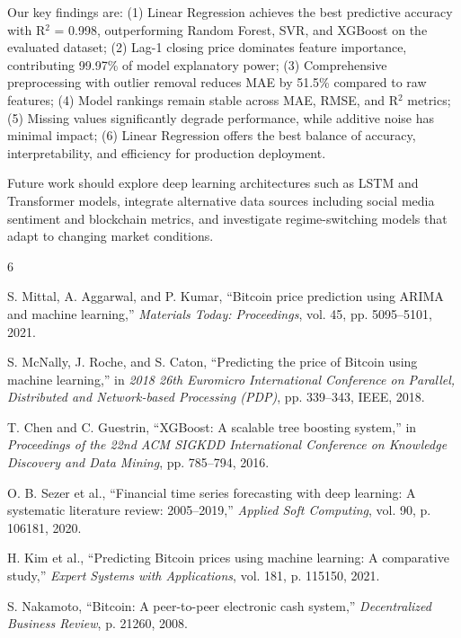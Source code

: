\documentclass[conference]{IEEEtran}
\begin{document}
Our key findings are:
(1) Linear Regression achieves the best predictive accuracy with R$^2$ = 0.998, outperforming Random Forest, SVR, and XGBoost on the evaluated dataset;
(2) Lag-1 closing price dominates feature importance, contributing 99.97\% of model explanatory power;
(3) Comprehensive preprocessing with outlier removal reduces MAE by 51.5\% compared to raw features;
(4) Model rankings remain stable across MAE, RMSE, and R$^2$ metrics;
(5) Missing values significantly degrade performance, while additive noise has minimal impact;
(6) Linear Regression offers the best balance of accuracy, interpretability, and efficiency for production deployment.

Future work should explore deep learning architectures such as LSTM and Transformer models, integrate alternative data sources including social media sentiment and blockchain metrics, and investigate regime-switching models that adapt to changing market conditions.



\begin{thebibliography}{6}

S. Mittal, A. Aggarwal, and P. Kumar, ``Bitcoin price prediction using ARIMA and machine learning,'' \textit{Materials Today: Proceedings}, vol. 45, pp. 5095--5101, 2021.

S. McNally, J. Roche, and S. Caton, ``Predicting the price of Bitcoin using machine learning,'' in \textit{2018 26th Euromicro International Conference on Parallel, Distributed and Network-based Processing (PDP)}, pp. 339--343, IEEE, 2018.

T. Chen and C. Guestrin, ``XGBoost: A scalable tree boosting system,'' in \textit{Proceedings of the 22nd ACM SIGKDD International Conference on Knowledge Discovery and Data Mining}, pp. 785--794, 2016.

O. B. Sezer et al., ``Financial time series forecasting with deep learning: A systematic literature review: 2005--2019,'' \textit{Applied Soft Computing}, vol. 90, p. 106181, 2020.

H. Kim et al., ``Predicting Bitcoin prices using machine learning: A comparative study,'' \textit{Expert Systems with Applications}, vol. 181, p. 115150, 2021.

S. Nakamoto, ``Bitcoin: A peer-to-peer electronic cash system,'' \textit{Decentralized Business Review}, p. 21260, 2008.

\end{thebibliography}
\end{document}
